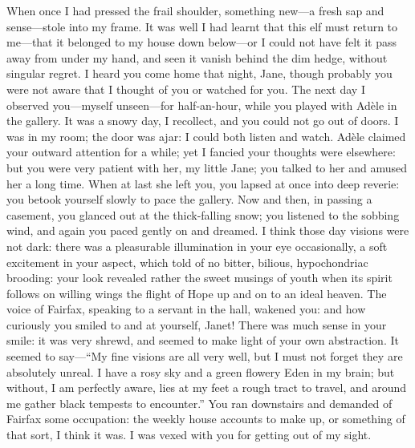 {	%
	When once I had pressed the frail shoulder, something new---a fresh
	sap and sense---stole into my frame. It was well I had learnt that this
	elf must return to me---that it belonged to my house down below---or I
	could not have felt it pass away from under my hand, and seen it vanish
	behind the dim hedge, without singular regret. I heard you come home
	that night, Jane, though probably you were not aware that I thought of
	you or watched for you. The next day I observed you---myself
	unseen---for half-an-hour, while you played with Adèle in the gallery.
	It was a snowy day, I recollect, and you could not go out of doors. I
	was in my room; the door was ajar: I could both listen and watch. Adèle
	claimed your outward attention for a while; yet I fancied your thoughts
	were elsewhere: but you were very patient with her, my little Jane; you
	talked to her and amused her a long time. When at last she left you,
	you lapsed at once into deep reverie: you betook yourself slowly to pace
	the gallery. Now and then, in passing a casement, you glanced out at
	the thick-falling snow; you listened to the sobbing wind, and again you
	paced gently on and dreamed. I think those day visions were not dark:
	there was a pleasurable illumination in your eye occasionally, a soft
	excitement in your aspect, which told of no bitter, bilious,
	hypochondriac brooding: your look revealed rather the sweet musings of
	youth when its spirit follows on willing wings the flight of Hope up and
	on to an ideal heaven. The voice of \Mrs{} Fairfax, speaking to a servant
	in the hall, wakened you: and how curiously you smiled to and at
	yourself, Janet! There was much sense in your smile: it was very
	shrewd, and seemed to make light of your own abstraction. It seemed to
	say---\enquote{My fine visions are all very well, but I must not forget they are
		absolutely unreal. I have a rosy sky and a green flowery Eden in my
		brain; but without, I am perfectly aware, lies at my feet a rough tract
		to travel, and around me gather black tempests to encounter.} You ran
	downstairs and demanded of \Mrs{} Fairfax some occupation: the weekly
	house accounts to make up, or something of that sort, I think it was. I
	was vexed with you for getting out of my sight.

}
